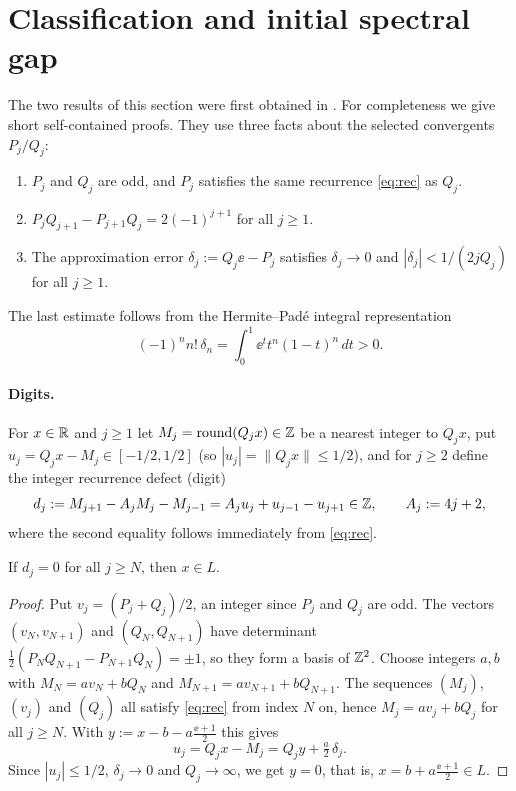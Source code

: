 \section{Classification and initial spectral gap}\label{sec:class}

The two results of this section were first obtained in \cite{Phase1}. For
completeness we give short self-contained proofs. They use three facts about the
selected convergents $P_j/Q_j$:
\begin{enumerate}[label=(\arabic*),leftmargin=2em]
\item $P_j$ and $Q_j$ are odd, and $P_j$ satisfies the same recurrence
\eqref{eq:rec} as $Q_j$.
\item $P_jQ_{j+1}-P_{j+1}Q_j=2(-1)^{j+1}$ for all $j\ge1$.
\item The approximation error $\delta_j:=Q_j\ee-P_j$ satisfies $\delta_j\to0$
and $|\delta_j|<1/(2jQ_j)$ for all $j\ge1$.
\end{enumerate}
The last estimate follows from the Hermite--Pad\'e integral
representation
\[
(-1)^n n!\,\delta_n=\int_0^1 \ee^t t^n(1-t)^n\,dt>0.
\]

\paragraph{Digits.} For $x\in\mathbb{R}$ and $j\ge1$ let $M_j=\mathrm{round}(Q_jx)\in\mathbb{Z}$
be a nearest integer to $Q_jx$, put $u_j=Q_jx-M_j\in[-1/2,1/2]$ (so
$|u_j|=\|Q_jx\|\le1/2$), and for $j\ge2$ define the integer recurrence defect
(digit)
\begin{equation}\label{eq:defect-id}
 d_j:=M_{j+1}-A_jM_j-M_{j-1}=A_ju_j+u_{j-1}-u_{j+1}\in\mathbb{Z},\qquad A_j:=4j+2,
\end{equation}
where the second equality follows immediately from \eqref{eq:rec}.

\begin{lemmaA}
If $d_j=0$ for all $j\ge N$, then $x\in L$.
\end{lemmaA}

\begin{proof}
Put $v_j=(P_j+Q_j)/2$, an integer since $P_j$ and $Q_j$ are odd. The
vectors $(v_N,v_{N+1})$ and $(Q_N,Q_{N+1})$ have determinant
$\tfrac12(P_NQ_{N+1}-P_{N+1}Q_N)=\pm1$, so they form a basis of $\mathbb{Z}^2$.
Choose integers $a,b$ with $M_N=av_N+bQ_N$ and $M_{N+1}=av_{N+1}+bQ_{N+1}$.
The sequences $(M_j)$, $(v_j)$ and $(Q_j)$ all satisfy \eqref{eq:rec}
from index $N$ on, hence $M_j=av_j+bQ_j$ for all $j\ge N$. With
$y:=x-b-a\frac{\ee+1}{2}$ this gives
\[
 u_j=Q_jx-M_j=Q_jy+\tfrac a2\,\delta_j .
\]
Since $|u_j|\le1/2$, $\delta_j\to0$ and $Q_j\to\infty$, we get $y=0$, that
is, $x=b+a\frac{\ee+1}{2}\in L$.
\end{proof}

